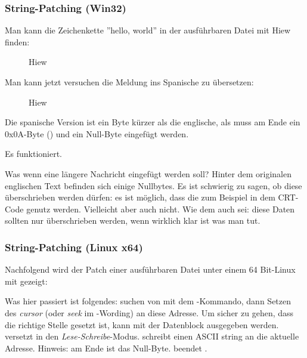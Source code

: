\subsubsection{String-Patching (Win32)}

Man kann die Zeichenkette ''hello, world'' in der ausführbaren Datei mit Hiew finden:

\begin{figure}[H]
\centering
{}
\caption{Hiew}
\label{}
\end{figure}

Man kann jetzt versuchen die Meldung ins Spanische zu übersetzen:

\begin{figure}[H]
\centering
{}
\caption{Hiew}
\label{}
\end{figure}

Die spanische Version ist ein Byte kürzer als die englische, als muss am Ende ein 0x0A-Byte () und ein Null-Byte eingefügt werden.

Es funktioniert.

Was wenn eine längere Nachricht eingefügt werden soll?
Hinter dem originalen englischen Text befinden sich einige Nullbytes.
Es ist schwierig zu sagen, ob diese überschrieben werden dürfen: es ist möglich, dass die zum Beispiel in dem \ac{CRT}-Code genutz werden. Vielleicht aber auch nicht.
Wie dem auch sei: diese Daten sollten nur überschrieben werden, wenn wirklich klar ist was man tut.

\subsubsection{String-Patching (Linux x64)}

\myindex{\radare}
Nachfolgend wird der Patch einer ausführbaren Datei unter einem 64 Bit-Linux mit \radare{} gezeigt:



Was hier passiert ist folgendes: suchen von  mit dem \TT{/}-Kommando,
dann Setzen des \emph{cursor} (oder \emph{seek} im \radare{}-Wording) an diese Adresse.
Um sicher zu gehen, dass die richtige Stelle gesetzt ist, kann mit  der Datenblock ausgegeben werden.
 versetzt \radare{} in den \emph{Lese-Schreibe}-Modus.
 schreibt einen ASCII string an die aktuelle Adresse.
Hinweis:  am Ende ist das Null-Byte.
 beendet \radare{}.

